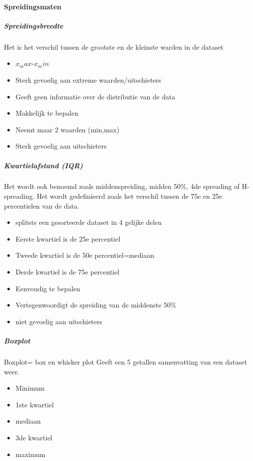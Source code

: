 \documentclass[12pt]{article}
\begin{document}
\paragraph{Spreidingsmaten}
\subparagraph{Spreidingsbreedte}
Het is het verschil tussen de grootste en de kleinste warden in de
dataset\begin{itemize}
    \item $x_max$-$x_min$
    \item Sterk gevoelig aan extreme waarden/uitschieters
    \item Geeft geen informatie over de distributie van de data
\end{itemize}
\begin{itemize}
    \item Makkelijk te bepalen 
    \item Neemt maar 2 waarden (min,max)
    \item Sterk gevoelig aan uitschieters
\end{itemize}
\subparagraph{Kwartielafstand (IQR)}
Het wordt ook benoemd zoals middenspreiding, midden 50\%, 4de
spreading of H-spreading. Het wordt gedefinieerd zoals het verschil
tussen de 75e en 25e percentielen van de data.
\begin{itemize}
    \item splitsts een gesorteerde dataset in 4 gelijke delen
    \item Eerste kwartiel is de 25e percentiel
    \item Tweede kwartiel is de 50e percentiel=mediaan
    \item Derde kwartiel is de 75e percentiel
\end{itemize}
\begin{itemize}
    \item Eenvoudig te bepalen 
    \item Vertegenwoordigt de spreiding van de middenste 50\% 
    \item niet gevoelig aan uitschieters
\end{itemize}
\subparagraph{Boxplot}
Boxplot= box en whisker plot
Geeft een 5 getallen samenvatting van een dataset weer.\begin{itemize}
    \item Minimum 
    \item 1ste kwartiel 
    \item mediaan 
    \item 3de kwartiel 
    \item maximum
\end{itemize}
\end{document}
